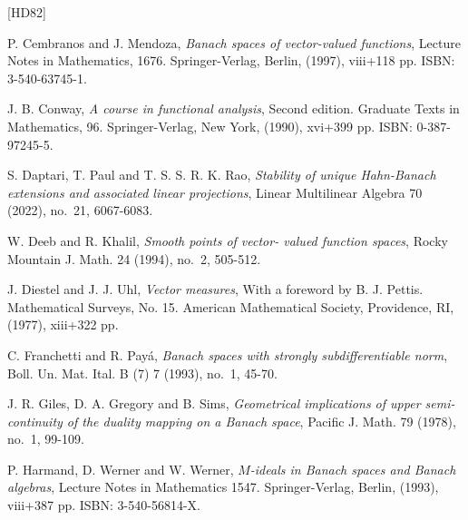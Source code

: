 \documentclass[12pt]{amsart}
\theoremstyle{definition}
\numberwithin{equation}{section}
\begin{document}
\begin{thebibliography}{[HD82]}




\normalsize
\baselineskip=17pt



 P. Cembranos and J. Mendoza,
\emph{Banach spaces of vector-valued functions}, Lecture Notes in Mathematics, 1676. Springer-Verlag, Berlin, (1997), {\rm viii}+118 pp. ISBN: 3-540-63745-1.

 J. B. Conway,
\emph{A course in functional analysis}, Second edition. Graduate Texts in Mathematics, 96. Springer-Verlag, New York, (1990), {\rm xvi}+399 pp. ISBN: 0-387-97245-5.

 S. Daptari, T. Paul and T. S. S. R. K. Rao, 
\emph{Stability of unique Hahn-Banach extensions and associated linear projections}, Linear Multilinear Algebra 70 (2022), no.~21, 6067-6083.

 W. Deeb and R. Khalil,
\emph{Smooth points of vector- valued function spaces}, Rocky Mountain J. Math. 24 (1994), no.~2, 505-512.

 J. Diestel and J. J. Uhl, 
\emph{Vector measures}, With a foreword by B. J. Pettis. Mathematical Surveys, No. 15. American Mathematical Society, Providence, RI, (1977), {\rm xiii}+322 pp.

 C. Franchetti and R. Payá,
\emph{Banach spaces with strongly subdifferentiable norm}, Boll. Un. Mat. Ital. B (7) 7 (1993), no.~1, 45-70.

 J. R. Giles, D. A. Gregory and B. Sims,
\emph{Geometrical implications of upper semi-continuity of the duality mapping on a Banach space}, Pacific J. Math. 79 (1978), no.~1, 99-109.

 P. Harmand, D. Werner and W. Werner, 
\emph{$M$-ideals in Banach spaces and Banach algebras}, Lecture Notes in Mathematics 1547. Springer-Verlag, Berlin, (1993), {\rm viii}+387 pp. ISBN: 3-540-56814-X.


\end{thebibliography}
\end{document}
